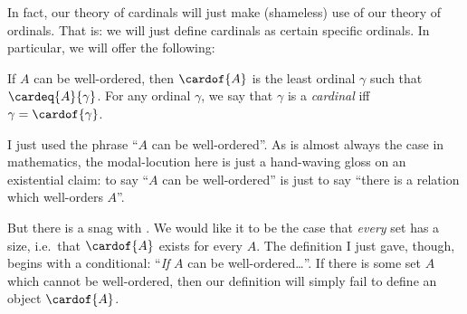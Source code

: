 \documentclass[../../../include/open-logic-section]{subfiles}
\begin{document}
In fact, our theory of cardinals will just make (shameless) use of our theory of ordinals. That is: we will just define cardinals as certain specific ordinals. In particular, we will offer the following:
\begin{defn}
	If $A$ can be well-ordered, then $\cardof{A}$ is the least ordinal $\gamma$ such that $\cardeq{A}{\gamma}$. For any ordinal $\gamma$, we say that $\gamma$ is a \emph{cardinal} iff $\gamma = \cardof{\gamma}$. 
\end{defn}\noindent
I just used the phrase ``$A$ can be well-ordered''. As is almost always the case in mathematics, the modal-locution here is just a hand-waving gloss on an existential claim: to say ``$A$ can be well-ordered'' is just to say ``there is a relation which well-orders $A$''. 

But there is a snag with . We would like it to be the case that \emph{every} set has a size, i.e.\ that $\cardof{A}$ exists for every $A$. The definition I just gave, though, begins with a conditional: ``\emph{If} $A$ can be well-ordered\ldots''. If there is some set $A$ which cannot be well-ordered, then our definition will simply fail to define an object $\cardof{A}$.
\end{document}

